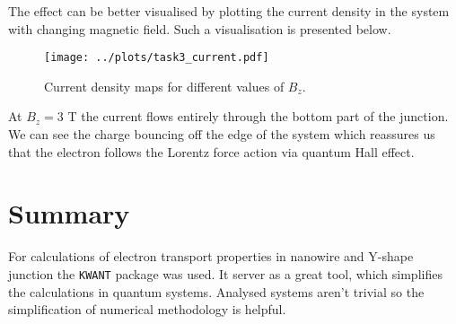 \documentclass[12pt,a4]{article}
\begin{document}
The effect can be better visualised by plotting the current density in the system with changing magnetic field. Such a visualisation is presented below.

\begin{figure}[H]
	\texttt{[image: ../plots/task3\_current.pdf]}
	\caption{Current density maps for different values of $ B_z $.}
\end{figure}

At $ B_z = 3 $ T the current flows entirely through the bottom part of the junction. We can see the charge bouncing off the edge of the system which reassures us that the electron follows the Lorentz force action via quantum Hall effect.

\section*{Summary}

For calculations of electron transport properties in nanowire and Y-shape junction the \texttt{KWANT} package was used. It server as a great tool, which simplifies the calculations in quantum systems. Analysed systems aren't trivial so the simplification of numerical methodology is helpful.
 
\end{document}
